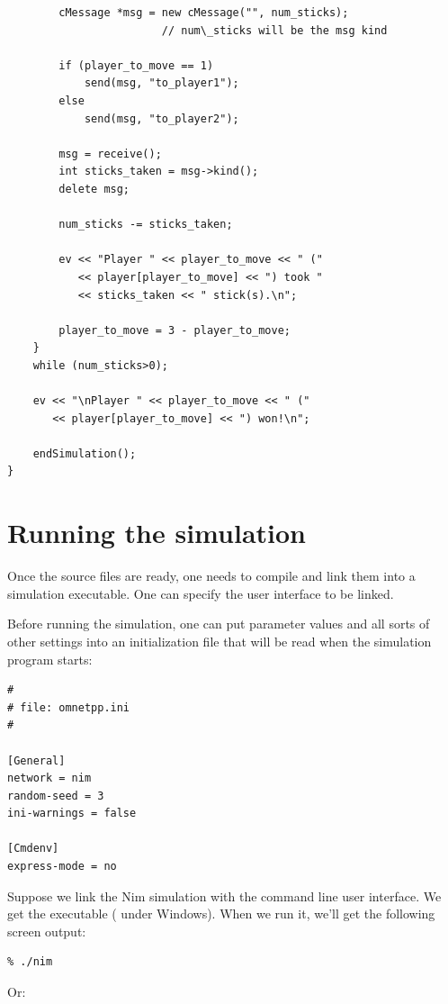 \begin{verbatim}
        cMessage *msg = new cMessage("", num_sticks);
                        // num\_sticks will be the msg kind

        if (player_to_move == 1)
            send(msg, "to_player1");
        else
            send(msg, "to_player2");

        msg = receive();
        int sticks_taken = msg->kind();
        delete msg;

        num_sticks -= sticks_taken;

        ev << "Player " << player_to_move << " ("
           << player[player_to_move] << ") took "
           << sticks_taken << " stick(s).\n";

        player_to_move = 3 - player_to_move;
    }
    while (num_sticks>0);

    ev << "\nPlayer " << player_to_move << " ("
       << player[player_to_move] << ") won!\n";

    endSimulation();
}
\end{verbatim}




\section{Running the simulation}

Once the source files are ready, one needs to compile and link
them into a simulation executable. One can specify the user interface
to be linked.

Before running the simulation, one can put parameter values and
all sorts of other settings into an initialization file that
will be read when the simulation program starts:


\begin{verbatim}
#
# file: omnetpp.ini
#

[General]
network = nim
random-seed = 3
ini-warnings = false

[Cmdenv]
express-mode = no
\end{verbatim}

Suppose we link the Nim simulation with the command line user
interface. We get the executable  ( under Windows).
When we run it, we'll get the following screen output:

\begin{verbatim}
% ./nim
\end{verbatim}

Or:

